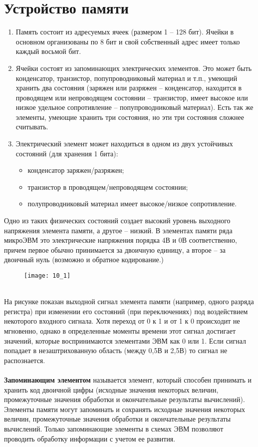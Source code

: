 \section{Устройство памяти}
\begin{enumerate}
 \item Память состоит из адресуемых ячеек (размером 1 -- 128 бит). Ячейки в основном организованы по 8 бит и свой собственный адрес имеет только каждый восьмой бит.
 \item Ячейки состоят из запоминающих электрических элементов. Это может быть конденсатор, транзистор, попупроводниковый материал и т.п., умеющий хранить два состояния (заряжен или разряжен -- конденсатор, находится в проводящем или непроводящем состоянии -- транзистор, имеет высокое или низкое удельное сопротивление -- попупроводниковый материал). Есть так же элементы, умеющие хранить три состояния, но эти три состояния сложнее считывать.
 \item Электрический элемент может находиться в одном из двух устойчивых состояний (для хранения 1 бита):
 \begin{itemize}
   \item конденсатор заряжен/разряжен;
   \item транзистор в проводящем/непроводящем состоянии;
   \item полупроводниковый материал имеет высокое/низкое сопротивление.
 \end{itemize}
\end{enumerate}
Одно из таких физических состояний создает высокий уровень выходного напряжения элемента памяти, а другое -- низкий. В элементах памяти ряда микроЭВМ это электрические напряжения порядка 4В и 0В соответственно, причем первое обычно принимается за двоичную единицу, а второе -- за двоичный нуль (возможно и обратное кодирование.)
\begin{figure}[h]
\texttt{[image: 10\_1]}
\end{figure}
\\На рисунке показан выходной сигнал элемента памяти (например, одного разряда регистра) при изменении его состояний (при переключениях) под воздействием некоторого входного сигнала. Хотя переход от 0 к 1 и от 1 к 0 происходит не мгновенно, однако в определенные моменты времени этот сигнал достигает значений, которые воспринимаются элементами ЭВМ как 0 или 1. Если сигнал попадает в незаштрихованную область (между 0,5В и 2,5В) то сигнал не распознается.
\\
\\\textbf{Запоминающим элементом} называется элемент, который способен принимать и хранить код двоичной цифры (исходные значения некоторых величин, промежуточные значения обработки и окончательные результаты вычислений). Элементы памяти могут запоминать и сохранять исходные значения некоторых величин, промежуточные значения обработки и окончательные результаты вычислений. Только запоминающие элементы в схемах ЭВМ позволяют проводить обработку информации с учетом ее развития.
